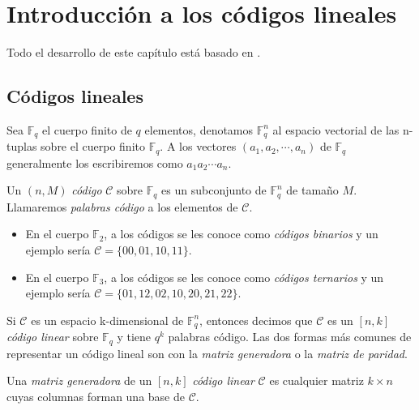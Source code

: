 
\chapter{Introducción a los códigos lineales}

Todo el desarrollo de este capítulo está basado en \cite{Huffman_Pless_2010} .
\section{Códigos lineales}

Sea $\mathbb{F}_q$ el cuerpo finito de $q$ elementos, denotamos $\mathbb{F}_q^n$ al espacio vectorial de las n-tuplas sobre el cuerpo finito $\mathbb{F}_q$. A los vectores $(a_1,a_2,\cdots,a_n)$ de $\mathbb{F}_q$ generalmente los escribiremos como $a_1a_2\cdots a_n$.



\begin{definition}
Un $(n,M)$ \emph{código} $\mathcal{C}$ sobre $\mathbb{F}_q$ es un subconjunto de $\mathbb{F}_q^n$ de tamaño $M$. Llamaremos \emph{palabras código} a los elementos de $\mathcal{C}$.
\end{definition}

\begin{exampleth}
\begin{itemize}
	\item En el cuerpo $\mathbb{F}_2$, a los códigos se les conoce como \emph{códigos binarios} y un ejemplo sería $\mathcal{C} = \{00,01,10,11\}$.

	\item En el cuerpo $\mathbb{F}_3$, a los códigos se les conoce como \emph{códigos ternarios} y un ejemplo sería $\mathcal{C} = \{01, 12, 02, 10, 20, 21, 22\}$.
\end{itemize}
\end{exampleth}

Si $\mathcal{C}$ es un espacio k-dimensional de $\mathbb{F}_q^n$, entonces decimos que $\mathcal{C}$ es un $\left[n,k\right]$ \emph{código linear} sobre $\mathbb{F}_q$ y tiene $q^k$ palabras código. Las dos formas más comunes de representar un código lineal son con la \emph{matriz generadora} o la \emph{matriz de paridad}.

\begin{definition}

Una \emph{matriz generadora} de un $\left[n,k\right]$ \emph{código linear} $\mathcal{C}$ es cualquier matriz $k \times n$ cuyas columnas forman una base de $\mathcal{C}$.
\end{definition}

